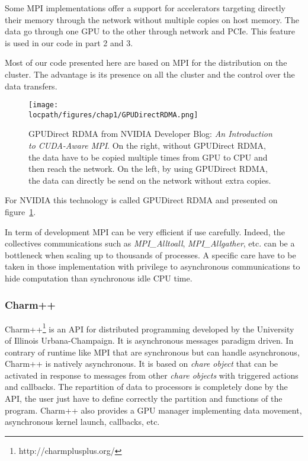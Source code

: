 Some MPI implementations offer a support for accelerators targeting directly their memory through the network without multiple copies on host memory. 
The data go through one GPU to the other through network and PCIe.
This feature is used in our code in part 2 and 3.

Most of our code presented here are based on MPI for the distribution on the cluster. 
The advantage is its presence on all the cluster and the control over the data transfers. 

\begin{figure}
\begin{center}
\texttt{[image: \\locpath/figures/chap1/GPUDirectRDMA.png]}
\caption[GPUDirect RDMA from NVIDIA]{GPUDirect RDMA from NVIDIA Developer Blog: \textit{An Introduction to CUDA-Aware MPI}. On the right, without GPUDirect RDMA, the data have to be copied multiple times from GPU to CPU and then reach the network. On the left, by using GPUDirect RDMA, the data can directly be send on the network without extra copies.}
\label{fig:1_HPC:gpudirect_rdma}
\end{center}
\end{figure}

For NVIDIA this technology is called GPUDirect RDMA and presented on figure~\ref{fig:1_HPC:gpudirect_rdma}. 

In term of development MPI can be very efficient if use carefully. 
Indeed, the collectives communications such as \textit{MPI\_Alltoall}, \textit{MPI\_Allgather}, etc. can be a bottleneck when scaling up to thousands of processes. 
A specific care have to be taken in those implementation with privilege to asynchronous communications to hide computation than synchronous idle CPU time. 

\subsubsection{Charm++}
Charm++\footnote{http://charmplusplus.org/} is an API for distributed programming developed by the University of Illinois Urbana-Champaign.
It is asynchronous messages paradigm driven.
In contrary of runtime like MPI that are synchronous but can handle asynchronous, Charm++ is natively asynchronous. 
It is based on \textit{chare object} that can be activated in response to messages from other \textit{chare objects} with triggered actions and callbacks. 
The repartition of data to processors is completely done by the API, the user just have to define correctly the partition and functions of the program. 
Charm++ also provides a GPU manager implementing data movement, asynchronous kernel launch, callbacks, etc.

